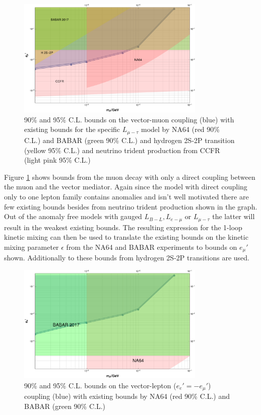 \begin{figure}[H]
  \centering
    \includegraphics[width=0.8\textwidth]{imgs/MuBoundOnVectorMuon.pdf}
    \caption{90\% and 95\% C.L. bounds on the vector-muon coupling (blue) with existing bounds for the specific $L_{\mu-\tau}$ model by NA64 (red 90\% C.L.) and BABAR (green 90\% C.L.) and hydrogen 2S-2P transition (yellow 95\% C.L.) and neutrino trident production from CCFR (light pink 95\% C.L.)}
    \label{fg:MuBoundVeMu}
\end{figure}
Figure \ref{fg:MuBoundVeMu} shows bounds from the muon decay with only a direct coupling between the muon and the vector mediator. Again since the model with direct coupling only to one lepton family contains anomalies and isn't well motivated there are few existing bounds besides from neutrino trident production shown in the graph. Out of the anomaly free models with gauged $L_{B-L},L_{e-\mu}$ or $L_{\mu-\tau}$ the latter will result in the weakest existing bounds. The resulting expression for the 1-loop kinetic mixing can then be used to translate the existing bounds on the kinetic mixing parameter $\epsilon$ from the NA64 and BABAR experiments to bounds on $e_\mu'$ shown. Additionally to these bounds from hydrogen 2S-2P transitions are used. 
\begin{figure}[H]
  \centering
    \includegraphics[width=0.8\textwidth]{imgs/MuBoundOnVectorLepton.pdf}
    \caption{90\% and 95\% C.L. bounds on the vector-lepton ($e_e'=-e_\mu'$) coupling (blue) with existing bounds by NA64 (red 90\% C.L.) and BABAR (green 90\% C.L.)}
    \label{fg:MuBoundVeEM}
\end{figure}

